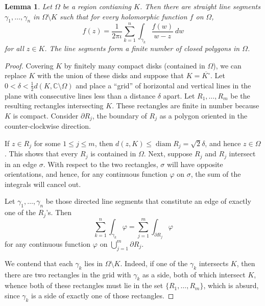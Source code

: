 \documentclass[11pt]{article}
\theoremstyle{thmstyle}
\newtheorem{lemma}[theorem]{Lemma}
\theoremstyle{defstyle}
\newcommand{\bbC}{\mathbb{C}}
\renewcommand{\le}{\leqslant}
\newcommand{\diam}{\operatorname{diam}}
\begin{document}
\begin{lemma}
    Let $\Omega$ be a region contianing $K$. Then there are straight line segments $\gamma_1,\dots,\gamma_n$ in $\Omega\setminus K$ such that for every holomorphic function $f$ on $\Omega$, 
    \begin{equation*}
        f(z) = \frac{1}{2\pi\iota}\sum_{k = 1}^n\int_{\gamma_k}\frac{f(w)}{w - z}~dw
    \end{equation*}
    for all $z\in K$. The line segments form a finite number of closed polygons in $\Omega$.
\end{lemma}
\begin{proof}
    Covering $K$ by finitely many compact disks (contained in $\Omega$), we can replace $K$ with the union of these disks and suppose that $K = \overline{K^\circ}$. Let $0 < \delta < \frac{1}{2}d(K, \bbC\setminus\Omega)$ and place a ``grid'' of horizontal and vertical lines in the plane with consecutive lines less than a distance $\delta$ apart. Let $R_1,\dots, R_m$ be the resulting rectangles intersecting $K$. These rectangles are finite in number because $K$ is compact. Consider $\partial R_j$, the boundary of $R_j$ as a polygon oriented in the counter-clockwise direction.  

    If $z\in R_j$ for some $1\le j\le m$, then $d(z, K)\le\diam R_j = \sqrt 2\delta$, and hence $z\in\Omega$. This shows that every $R_j$ is contained in $\Omega$. Next, suppose $R_j$ and $R_j$ intersect in an edge $\sigma$. With respect to the two rectangles, $\sigma$ will have opposite orientations, and hence, for any continuous function $\varphi$ on $\sigma$, the sum of the integrals will cancel out.

    Let $\gamma_1,\dots,\gamma_n$ be those directed line segments that constitute an edge of exactly one of the $R_j$'s. Then
    \begin{equation}
        \sum_{k = 1}^n \int_{\gamma_k}\varphi = \sum_{j = 1}^m \int_{\partial R_j}\varphi\label{integration-on-polygons}
    \end{equation}
    for any continuous function $\varphi$ on $\displaystyle\bigcup_{j = 1}^m\partial R_j$.

    We contend that each $\gamma_k$ lies in $\Omega\setminus K$. Indeed, if one of the $\gamma_k$ intersects $K$, then there are two rectangles in the grid with $\gamma_k$ as a side, both of which intersect $K$, whence both of these rectangles must lie in the set $\{R_1,\dots,R_m\}$, which is absurd, since $\gamma_k$ is a side of exactly one of those rectangles. 


\end{proof}
\end{document}

